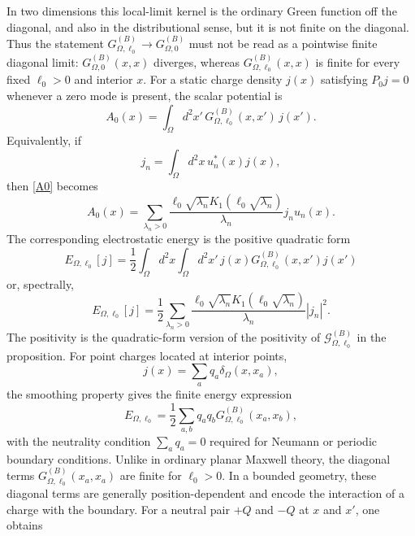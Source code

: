 \documentclass[nopacs,amsmath,amsfonts,amssymb,aps,superscriptaddress]{revtex4}
\begin{document}
In two dimensions this local-limit kernel is the ordinary Green function off the diagonal, and also in the distributional sense, but it is not finite on the diagonal. Thus the statement $G_{\Omega,\ell_0}^{(B)}\to G_{\Omega,0}^{(B)}$ must not be read as a pointwise finite diagonal limit: $G_{\Omega,0}^{(B)}(x,x)$ diverges, whereas $G_{\Omega,\ell_0}^{(B)}(x,x)$ is finite for every fixed $\ell_0>0$ and interior $x$. For a static charge density $j(x)$ satisfying $P_0j=0$ whenever a zero mode is present, the scalar potential is
\begin{equation}\label{A0}
  A_0(x)=\int_\Omega d^2x'\,G_{\Omega,\ell_0}^{(B)}(x,x')\,j(x').
\end{equation}
Equivalently, if
\begin{equation}
  j_n=\int_\Omega d^2x\,u_n^*(x)j(x),
\end{equation}
then \eqref{A0} becomes
\begin{equation}
  A_0(x)=\sum_{\lambda_n>0}
  \frac{\ell_0\sqrt{\lambda_n}K_1(\ell_0\sqrt{\lambda_n})}{\lambda_n}
  j_n u_n(x).
\end{equation}
The corresponding electrostatic energy is the positive quadratic form
\begin{equation}
  E_{\Omega,\ell_0}[j]
  =\frac{1}{2}\int_\Omega d^2x\int_\Omega d^2x'\,
  j(x)G_{\Omega,\ell_0}^{(B)}(x,x')j(x')
\end{equation}
or, spectrally,
\begin{equation}
  E_{\Omega,\ell_0}[j]
  =\frac{1}{2}\sum_{\lambda_n>0}
  \frac{\ell_0\sqrt{\lambda_n}K_1(\ell_0\sqrt{\lambda_n})}{\lambda_n}|j_n|^2.
\end{equation}
The positivity is the quadratic-form version of the positivity of $\mathcal G_{\Omega,\ell_0}^{(B)}$ in the proposition. For point charges located at interior points,
\begin{equation}
  j(x)=\sum_a q_a\delta_\Omega(x,x_a),
\end{equation}
the smoothing property gives the finite energy expression
\begin{equation}
  E_{\Omega,\ell_0}=\frac{1}{2}\sum_{a,b}q_a q_b
  G_{\Omega,\ell_0}^{(B)}(x_a,x_b),
\end{equation}
with the neutrality condition $\sum_a q_a=0$ required for Neumann or periodic boundary conditions. Unlike in ordinary planar Maxwell theory, the diagonal terms $G_{\Omega,\ell_0}^{(B)}(x_a,x_a)$ are finite for $\ell_0>0$. In a bounded geometry, these diagonal terms are generally position-dependent and encode the interaction of a charge with the boundary. For a neutral pair $+Q$ and $-Q$ at $x$ and $x'$, one obtains
\end{document}
